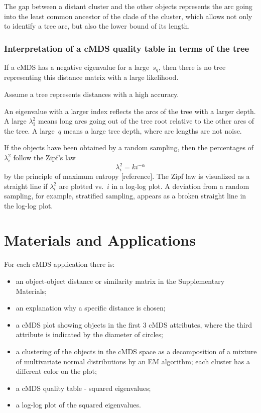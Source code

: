 \documentclass[10pt,a4paper]{article}
\begin{document}
The gap between a distant cluster and the other objects represents the arc going into the least common ancestor of the clade of the cluster, which allows not only to identify a tree arc, but also the lower bound of its length.


\subsubsection {Interpretation of a cMDS quality table in terms of the tree}

If a cMDS has a negative eigenvalue for a large~$s_q$, then there is no tree representing this distance matrix with a large likelihood.

Assume a tree represents distances with a high accuracy.

An eigenvalue with a larger index reflects the arcs of the tree with a larger depth.
A large $\lambda_1^2$ means long arcs going out of the tree root relative to the other arcs of the tree.
A large~$q$ means a large tree depth, where arc lengths are not noise.

If the objects have been obtained by a random sampling, then the percentages of $\lambda_i^2$ follow the Zipf's law
$$ \lambda_i^2 = k i^{-\alpha}$$
by the principle of maximum entropy [reference].
The Zipf law is visualized as a straight line if $\lambda_i^2$ are plotted vs.~$i$ in a log-log plot.
A deviation from a random sampling, for example, stratified sampling, appears as a broken straight line in the log-log plot.



\section{Materials and Applications}

For each cMDS application there is:
\begin{itemize}
\item an object-object distance or similarity matrix in the Supplementary Materials;
\item an explanation why a specific distance is chosen;
\item a cMDS plot showing objects in the first 3 cMDS attributes,
  where the third attribute is indicated by the diameter of circles;
\item a clustering of the objects in the cMDS space
      as a decomposition of a mixture of multivariate normal distributions by an EM  algorithm;
      each cluster has a different color on the plot;
\item a cMDS quality table - squared eigenvalues;
\item a log-log plot of the squared eigenvalues.
\end{itemize}
\end{document}
